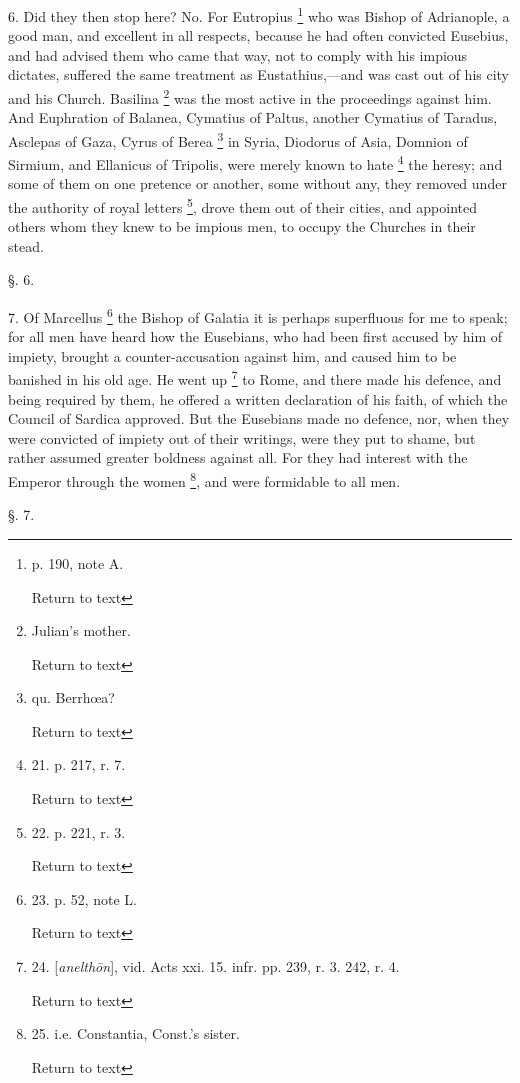 6. Did they then stop here? No. For Eutropius \footnote{p. 190, note A.

Return to text} who was Bishop of Adrianople, a good man, and excellent in all
respects, because he had often convicted Eusebius, and had advised them who came that way, not to comply with his impious
dictates, suffered the same treatment as Eustathius,—and was cast
out of his city and his Church. Basilina \footnote{Julian's mother.

Return to text} was the most active in the proceedings against him. And
Euphration of Balanea, Cymatius of Paltus, another Cymatius of Taradus,
Asclepas of Gaza, Cyrus of Berea \footnote{qu. Berrhœa?

Return to text} in Syria, Diodorus of Asia, Domnion of Sirmium, and Ellanicus
of Tripolis, were merely known to hate \footnote{21.
p. 217, r. 7.

Return to text} the heresy; and some of them on one pretence or another, some
without any, they removed under the authority of royal letters \footnote{22.
p. 221, r. 3.

Return to text}, drove them out of their cities, and appointed others whom
they knew to be impious men, to occupy the Churches in their stead.

§. 6.

7. Of Marcellus \footnote{23.
p. 52, note L.

Return to text} the Bishop of Galatia it is perhaps superfluous for me to
speak; for all men have heard how the Eusebians, who had been first
accused by him of impiety, brought a counter-accusation against him,
and caused him to be banished in his old age. He went up \footnote{24.
[\emph{anelth\={o}n}], vid. Acts xxi. 15. infr. pp. 239, r. 3. 242,
r. 4.

Return to text} to Rome, and there made his defence, and being required by
them, he offered a written declaration of his faith, of which the
Council of Sardica approved. But the Eusebians made no defence, nor,
when they were convicted of impiety out of their writings, were they
put to shame, but rather assumed greater boldness against all. For
they had interest with the Emperor through the women \footnote{25.
i.e. Constantia, Const.'s sister.

Return to text}, and were formidable to all men.

§. 7.


